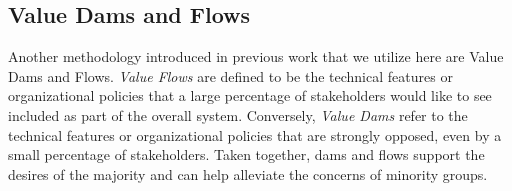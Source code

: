 \pagebreak

\subsection{Value Dams and Flows}
Another methodology introduced in previous work \cite{miller-2007} that we utilize here are Value Dams and Flows. \emph{Value Flows} are defined to be the technical features or organizational policies that a large percentage of stakeholders would like to see included as part of the overall system. Conversely, \emph{Value Dams} refer to the technical features or organizational policies that are strongly opposed, even by a small percentage of stakeholders. Taken together, dams and flows support the desires of the majority and can help alleviate the concerns of minority groups. 

